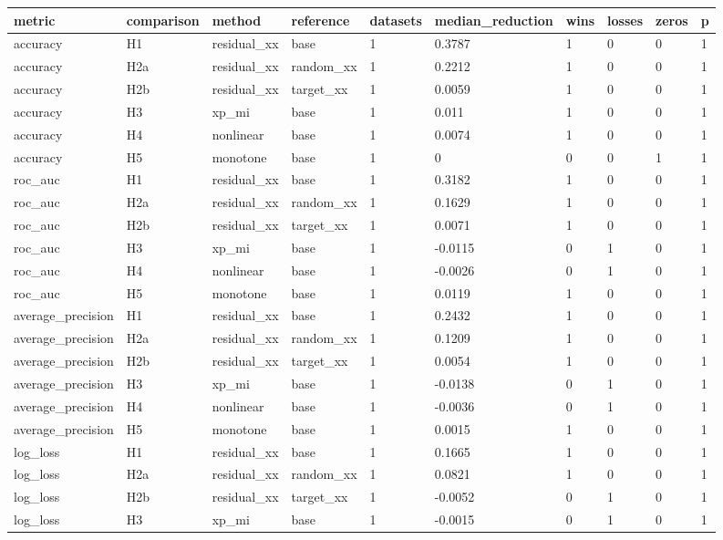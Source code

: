 \begin{tabular}{llllllllll}
\toprule
metric & comparison & method & reference & datasets & median\_reduction & wins & losses & zeros & p \\
\midrule
accuracy & H1 & residual\_xx & base & 1 & 0.3787 & 1 & 0 & 0 & 1 \\
accuracy & H2a & residual\_xx & random\_xx & 1 & 0.2212 & 1 & 0 & 0 & 1 \\
accuracy & H2b & residual\_xx & target\_xx & 1 & 0.0059 & 1 & 0 & 0 & 1 \\
accuracy & H3 & xp\_mi & base & 1 & 0.011 & 1 & 0 & 0 & 1 \\
accuracy & H4 & nonlinear & base & 1 & 0.0074 & 1 & 0 & 0 & 1 \\
accuracy & H5 & monotone & base & 1 & 0 & 0 & 0 & 1 & 1 \\
roc\_auc & H1 & residual\_xx & base & 1 & 0.3182 & 1 & 0 & 0 & 1 \\
roc\_auc & H2a & residual\_xx & random\_xx & 1 & 0.1629 & 1 & 0 & 0 & 1 \\
roc\_auc & H2b & residual\_xx & target\_xx & 1 & 0.0071 & 1 & 0 & 0 & 1 \\
roc\_auc & H3 & xp\_mi & base & 1 & -0.0115 & 0 & 1 & 0 & 1 \\
roc\_auc & H4 & nonlinear & base & 1 & -0.0026 & 0 & 1 & 0 & 1 \\
roc\_auc & H5 & monotone & base & 1 & 0.0119 & 1 & 0 & 0 & 1 \\
average\_precision & H1 & residual\_xx & base & 1 & 0.2432 & 1 & 0 & 0 & 1 \\
average\_precision & H2a & residual\_xx & random\_xx & 1 & 0.1209 & 1 & 0 & 0 & 1 \\
average\_precision & H2b & residual\_xx & target\_xx & 1 & 0.0054 & 1 & 0 & 0 & 1 \\
average\_precision & H3 & xp\_mi & base & 1 & -0.0138 & 0 & 1 & 0 & 1 \\
average\_precision & H4 & nonlinear & base & 1 & -0.0036 & 0 & 1 & 0 & 1 \\
average\_precision & H5 & monotone & base & 1 & 0.0015 & 1 & 0 & 0 & 1 \\
log\_loss & H1 & residual\_xx & base & 1 & 0.1665 & 1 & 0 & 0 & 1 \\
log\_loss & H2a & residual\_xx & random\_xx & 1 & 0.0821 & 1 & 0 & 0 & 1 \\
log\_loss & H2b & residual\_xx & target\_xx & 1 & -0.0052 & 0 & 1 & 0 & 1 \\
log\_loss & H3 & xp\_mi & base & 1 & -0.0015 & 0 & 1 & 0 & 1 \\

\end{tabular}
